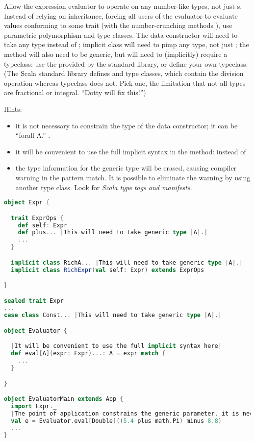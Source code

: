 \documentclass[10 pt]{article}
\begin{document}
\begin{example}
Allow the expression evaluator to operate on any number-like types, not just s. Instead of relying on inheritance, forcing all users of the evaluator to evaluate values conforming to some trait (with the number-crunching methods \pcode{+, -, *, /}), use parametric polymorphism and type classes. The  data constructor will need to take any type instead of ;  implicit class will need to pimp any type, not just ; the  method will also need to be generic, but will need to (implicitly) require a typeclass: use the  provided by the standard library, or define your own  typeclass. (The Scala standard library defines  and  type classes, which contain the division operation whereas  typeclass does not. Pick one, the limitation that not all types are fractional or integral. ``Dotty will fix this!'')

Hints: \begin{itemize}
  \item it is not necessary to constrain the type of the  data constructor; it can be ``forall A.'' .
  \item it will be convenient to use the full implicit syntax in the  method:  instead of 
  \item the type information for the generic type  will be erased, causing compiler warning in the pattern match. It is possible to eliminate the warning by using another type class. Look for \emph{Scala type tags and manifests}.
\end{itemize}

\begin{lstlisting}[caption={Flexible evaluator (with DSL)}, label={code:eepm3}, language=Scala, escapechar=|]
object Expr {

  trait ExprOps {
    def self: Expr
    def plus... |This will need to take generic type |A|.|
    ...
  }

  implicit class RichA... |This will need to take generic type |A|.|
  implicit class RichExpr(val self: Expr) extends ExprOps

}

sealed trait Expr
...
case class Const... |This will need to take generic type |A|.|

object Evaluator {

  |It will be convenient to use the full implicit syntax here|
  def eval[A](expr: Expr)...: A = expr match {
    ...
  }

}

object EvaluatorMain extends App {
  import Expr._
  |The point of application constrains the generic parameter, it is necessary to specify the type |A|. in |eval|.|
  val e = Evaluator.eval[Double]((5.4 plus math.Pi) minus 8.8)
  ...
}
\end{lstlisting}
\end{example}
\end{document}
